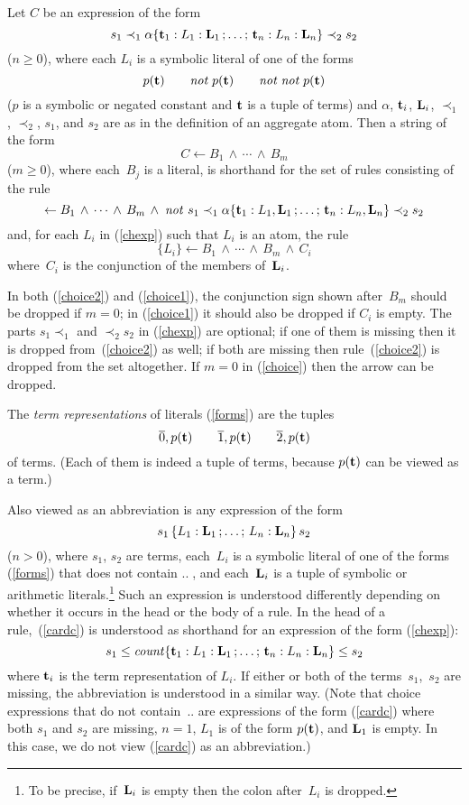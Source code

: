 \documentclass{tlp}
\def\ar{\leftarrow}
\def\beq{\begin{equation}}
\def\eeq#1{\label{#1}\end{equation}}
\def\no{{\it not}}
\begin{document}
Let $C$ be an expression of the form
\beq
s_1\prec_1
\alpha\{{\bf t}_1 : L_1 : {\bf L}_1\,;\ldots;\,{\bf t}_n : L_n : {\bf L}_n\}
\prec_2s_2
\eeq{chexp}
($n \geq 0$),
where
each $L_i$ is a symbolic literal of one of the forms 
\beq
p({\bf t})\qquad  \no \; p({\bf t})\qquad   \no \; \no \; p({\bf t})
\eeq{forms}
($p$ is a symbolic or negated constant and ${\bf t}$ is a tuple of terms)
and $\alpha$, ${\bf t}_i$, ${\bf L}_i$, $\prec_1$, $\prec_2$, $s_1$, and $s_2$  
are as in the definition of an aggregate atom.
Then a string of the form
\beq
C \ar B_1\,\land\,\cdots\,\land\,B_m
\eeq{choice}
($m\geq 0$), where each~$B_j$ is a literal,
 is shorthand for the set of rules consisting of the rule 
\beq
\ar B_1\,\land\,\cdots\,\land\,B_m\,\land\;
  \no\ s_1\prec_1
\alpha\{{\bf t}_1 : L_1 , {\bf L}_1\,;\ldots;\,{\bf t}_n : L_n , {\bf L}_n\}
\prec_2s_2
\eeq{choice2}
and, for each $L_i$ in (\ref{chexp}) such that $L_i$ is an atom, the rule
\beq
\{L_i\} \ar B_1\,\land\,\cdots\,\land\,B_m\,\land\,C_i
\eeq{choice1}
where~$C_i$ is the conjunction of the members 
of~${\bf L}_i$. 

In both (\ref{choice2}) and (\ref{choice1}), the conjunction sign shown 
after~$B_m$ should be dropped if $m=0$; in (\ref{choice1}) it should also 
be dropped if $C_i$ is empty.  The parts $s_1\prec_1$ and $\prec_2s_2$ in 
(\ref{chexp}) are optional; if one of them is
missing then it is dropped from~(\ref{choice2}) as well; if both are missing
then rule~(\ref{choice2}) is dropped from the set altogether.  If $m=0$ in 
(\ref{choice}) then the arrow can be dropped.

The {\sl term representations} of literals (\ref{forms}) are the tuples
$$
\overline 0, p({\bf t})\qquad \overline 1,p({\bf t}) \qquad \overline 2, p({\bf t})
$$
of terms. (Each of them is indeed a tuple of terms, because 
$p({\bf t})$ can be viewed as a term.)
 
Also viewed as an abbreviation is any expression of the form
\beq
s_1\,\{L_1:{\bf L}_1\,;\ldots;\,L_n:{\bf L}_n\}\,s_2
\eeq{cardc}
($n>0$), where $s_1$, $s_2$ are terms,
each~$L_i$ is a symbolic literal  of one of the forms  
(\ref{forms}) that does not contain $..\;$, and each~${\bf L}_i$ is a tuple
of symbolic or arithmetic literals.\footnote{To be precise, if~${\bf L}_i$ 
is empty then the colon after~$L_i$ is dropped.} 
Such an expression is understood differently 
depending on whether it occurs in the head or the body of a rule.
In the head of a rule,~(\ref{cardc}) is understood as shorthand for
an expression of the form (\ref{chexp}):
\beq
s_1\leq
{\it count}\{{\bf t}_1: L_1 : {\bf L}_1\,;\ldots;\,{\bf t}_n: L_n : {\bf L}_n\}
\leq s_2
\eeq{choicehead}
where ${\bf t}_i$ is the term representation of $L_i$.  If either or 
both of the terms~$s_1$,~$s_2$ are missing, the abbreviation is 
understood in a similar way. (Note that choice expressions that do not 
contain~$..$ are 
expressions of the form (\ref{cardc}) where both $s_1$ and $s_2$ are missing, 
$n =1$, $L_1$ is of the form $p({\bf t})$, and ${\bf L}_1$ is empty. In this 
case, we do not view (\ref{cardc}) as an abbreviation.)
 
\end{document}
